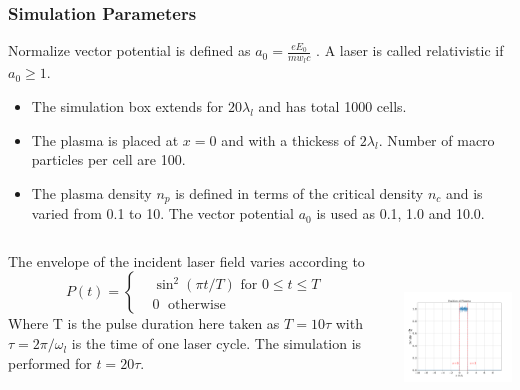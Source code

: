 \documentclass{beamer}
\begin{document}
\begin{frame}
    \small
    \frametitle{Simulation Parameters}
    Normalize vector potential is defined as
    $
        a_0 = \frac{eE_0}{m w_l c}
    $
    . A laser is called relativistic if $a_0 \ge 1$.
    \begin{itemize}
        \item The simulation box extends for $20 \lambda _l$ and has total 1000 cells.
        \item  The plasma is placed at $x=0$ and with a thickess of $2\lambda_l$.  Number of macro particles per cell are 100.
        \item The plasma density $n_p$ is defined in terms of the critical density $n_c$ and is varied from 0.1 to 10. The vector potential $a_0$ is used as 0.1, 1.0 and 10.0.
    \end{itemize}

    \small
    \begin{columns}
        \begin{column}{0.5\textwidth}
            The envelope of the incident laser field varies according to\cite{lichters}
            \begin{equation*}
                P(t)=
                \begin{cases}
                     & \sin^2(\pi t/T) \text{ for } 0 \leq t \le T \\
                     & 0         \;      \text{ otherwise }
                \end{cases}
            \end{equation*}
            Where T is the pulse duration here taken as $T=10\tau$ with $\tau = 2\pi/\omega_l$ is the time of one laser cycle. The simulation is performed for $t=20\tau$.
        \end{column}
        \begin{column}{0.5\textwidth}  %
            \includegraphics[width=6.5cm, height=4.5cm]{plasma.png}
        \end{column}
    \end{columns}
\end{frame}
\end{document}
